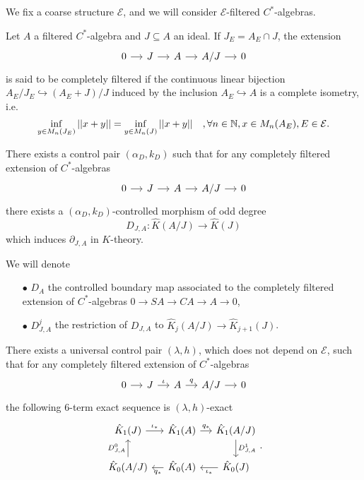 We fix a coarse structure $\mathcal E$, and we will consider $\mathcal E$-filtered $C^*$-algebras.

\begin{definition}
Let $A$ a filtered $C^*$-algebra and $J\subseteq A$ an ideal. If $J_E = A_E\cap J$, the extension
\[\begin{tikzcd}[column sep = small]0\arrow{r} & J\arrow{r} & A\arrow{r} & A/J\arrow{r} & 0 \end{tikzcd}\]
is said to be completely filtered if the continuous linear bijection $A_E/J_E \hookrightarrow (A_E+J)/J$ induced by the inclusion $A_E\hookrightarrow A$ is a complete isometry, i.e.
\[ \inf_{y\in M_n(J_E)} ||x+y|| = \inf_{y\in M_n(J)} ||x+y||\quad,\forall n\in \mathbb N,x\in M_n(A_E),E\in \mathcal E.\]
\end{definition}

\begin{prop}
There exists a control pair $(\alpha_D,k_D)$ such that for any completely filtered extension of $C^*$-algebras
\[\begin{tikzcd}[column sep = small]0\arrow{r} & J\arrow{r} & A\arrow{r} & A/J\arrow{r} & 0 \end{tikzcd}\]
there exists a $(\alpha_D,k_D)$-controlled morphism of odd degree
\[D_{J,A} : \hat K(A/J)\rightarrow \hat K(J)\]
which induces $\partial_{J,A}$ in $K$-theory.
\end{prop}

We will denote 
\begin{itemize}
\item[$\bullet$] $D_A$ the controlled boundary map associated to the completely filtered extension of $C^*$-algebras $0 \rightarrow SA \rightarrow CA \rightarrow A \rightarrow 0 $,
\item[$\bullet$] $D^j_{J,A}$ the restriction of $D_{J,A}$ to $\hat K_j(A/J)\rightarrow \hat K_{j+1}(J)$.
\end{itemize} 

\begin{thm}
There exists a universal control pair $(\lambda,h)$, which does not depend on $\mathcal E$, such that for any completely filtered extension of $C^*$-algebras 
\[\begin{tikzcd}[column sep = small]0\arrow{r} & J\arrow{r}{\iota} & A\arrow{r}{q} & A/J\arrow{r} & 0 \end{tikzcd}\]
the following $6$-term exact sequence is $(\lambda,h)$-exact
\[\begin{tikzcd}[column sep = small]
 \hat K_1(J) \arrow{r}{\iota_*} & \hat K_1(A) \arrow{r}{q_*} & \hat K_1(A/J)\arrow{d}{D^1_{J,A}} \\
 \hat K_0(A/J) \arrow{u}{D^0_{J,A}} & \hat K_0(A) \arrow{l}{q_*} & \hat K_0(J)\arrow{l}{\iota_*}
\end{tikzcd}.\]
\end{thm}

